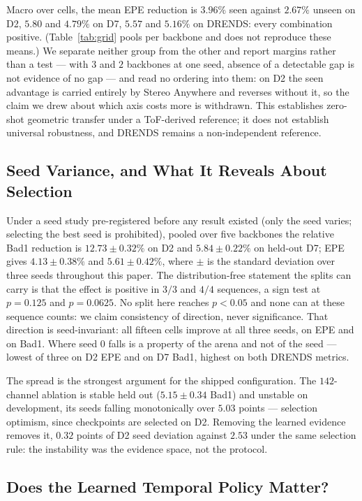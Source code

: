 \documentclass[letterpaper,10pt,conference]{ieeeconf}
\begin{document}
Macro over cells, the mean EPE reduction is $3.96\%$ seen against $2.67\%$
unseen on D2, $5.80$ and $4.79\%$ on D7, $5.57$ and $5.16\%$ on DRENDS: every
combination positive. (Table~\ref{tab:grid} pools per backbone and does not
reproduce these means.) We separate neither group from the other
and report margins rather than a test --- with $3$ and $2$ backbones at one
seed, absence of a detectable gap is not evidence of no gap --- and read no
ordering into them: on D2 the seen advantage is carried entirely by Stereo
Anywhere and reverses without it, so the claim we drew about which axis costs
more is withdrawn. This establishes zero-shot geometric transfer under a ToF-derived
reference; it does not establish universal robustness, and DRENDS remains a
non-independent reference.

\subsection{Seed Variance, and What It Reveals About Selection}
\label{sec:seeds}

Under a seed study pre-registered before any result existed (only the seed
varies; selecting the best seed is prohibited),
pooled over five backbones the relative Bad1 reduction is $12.73\pm0.32\%$ on
D2 and $5.84\pm0.22\%$ on held-out D7; EPE gives $4.13\pm0.38\%$ and
$5.61\pm0.42\%$, where $\pm$ is the standard deviation over three seeds
throughout this paper. The distribution-free statement the splits can
carry is that the effect is positive in $3/3$ and $4/4$ sequences, a sign test
at $p=0.125$ and $p=0.0625$. No split here reaches $p<0.05$ and none can at
these sequence counts: we claim consistency of direction, never significance.
That direction is seed-invariant: all fifteen cells improve at all three
seeds, on EPE and on Bad1. Where seed $0$ falls is a property of the arena and
not of the seed --- lowest of three on D2 EPE and on D7 Bad1, highest on both
DRENDS metrics.

The spread is the strongest argument for the shipped configuration. The
$142$-channel ablation is stable held out ($5.15\pm0.34$ Bad1) and unstable on
development, its seeds falling monotonically over $5.03$ points --- selection
optimism, since checkpoints are selected on D2. Removing the learned evidence
removes it, $0.32$ points of D2 seed deviation against $2.53$ under the same
selection rule: the instability was the evidence space, not the protocol.

\subsection{Does the Learned Temporal Policy Matter?}
\label{sec:closure}
\end{document}

